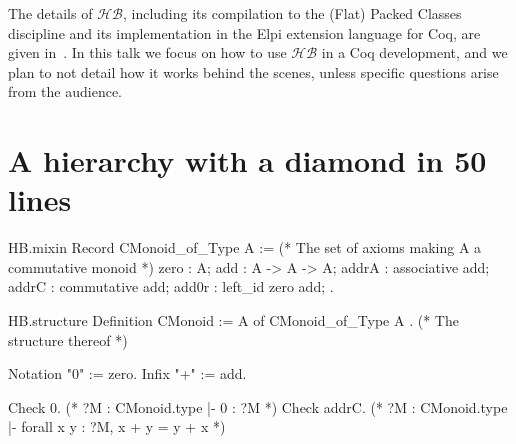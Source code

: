 \documentclass{easychair}
\newcommand{\HB}{\ensuremath{\mathcal{HB}}}
\begin{document}
The details of \HB{}, including its compilation to the (Flat) Packed Classes
discipline and its implementation in the Elpi extension language for Coq,
are given in~\cite{cohen:hal-02478907}.
In this talk we focus on how to use \HB{} in a Coq development, and we plan
to not detail how it works behind the scenes, unless specific questions
arise from the audience.

\section{A hierarchy with a diamond in 50 lines}

\begin{coqcode}
HB.mixin Record CMonoid_of_Type A := { (* The set of axioms making A a commutative monoid *)
  zero  : A;
  add   : A -> A -> A;
  addrA : associative add;
  addrC : commutative add;
  add0r : left_id zero add;
}.

HB.structure Definition CMonoid := { A of CMonoid_of_Type A }. (* The structure thereof *)

Notation "0" := zero.
Infix    "+" := add.

Check 0.     (* ?M : CMonoid.type |- 0 : ?M *)
Check addrC. (* ?M : CMonoid.type |- forall x y : ?M, x + y = y + x *)
\end{coqcode}

\newpage
\end{document}
